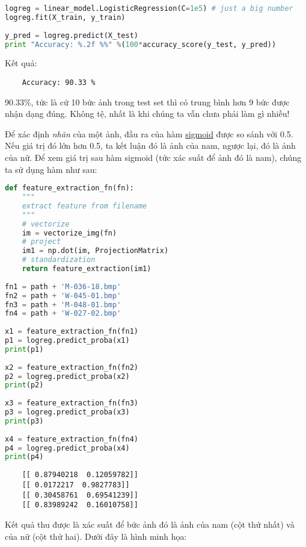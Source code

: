  
\begin{lstlisting}[language=Python]
logreg = linear_model.LogisticRegression(C=1e5) # just a big number  
logreg.fit(X_train, y_train) 
 
y_pred = logreg.predict(X_test) 
print "Accuracy: %.2f %%" %(100*accuracy_score(y_test, y_pred)) 
\end{lstlisting}
Kết quả:
\begin{lstlisting}
    Accuracy: 90.33 % 
\end{lstlisting}
 
90.33\%, tức là cứ 10 bức ảnh trong test set thì có trung bình hơn 9 bức được nhận dạng đúng. Không tệ, nhất là khi chúng ta vẫn chưa phải làm gì nhiều! 
 
Để xác định \textit{nhãn} của một ảnh, đầu ra của hàm \href{http://machinelearningcoban.com/2017/01/27/logisticregression/#sigmoid-function}{sigmoid} được so sánh với 0.5. Nếu giá trị đó lớn hơn 0.5, ta kết luận đó là ảnh của nam, ngược lại, đó là ảnh của nữ. Để xem giá trị sau hàm sigmoid (tức xác suất để ảnh đó là nam), chúng ta sử dụng hàm  như sau: 
 
\begin{lstlisting}[language=Python]
def feature_extraction_fn(fn): 
    """ 
    extract feature from filename 
    """ 
    # vectorize 
    im = vectorize_img(fn) 
    # project 
    im1 = np.dot(im, ProjectionMatrix) 
    # standardization  
    return feature_extraction(im1) 
 
fn1 = path + 'M-036-18.bmp' 
fn2 = path + 'W-045-01.bmp' 
fn3 = path + 'M-048-01.bmp' 
fn4 = path + 'W-027-02.bmp' 
 
x1 = feature_extraction_fn(fn1) 
p1 = logreg.predict_proba(x1) 
print(p1) 
 
x2 = feature_extraction_fn(fn2) 
p2 = logreg.predict_proba(x2) 
print(p2) 
 
x3 = feature_extraction_fn(fn3) 
p3 = logreg.predict_proba(x3) 
print(p3) 
 
x4 = feature_extraction_fn(fn4) 
p4 = logreg.predict_proba(x4) 
print(p4) 
\end{lstlisting}
\begin{lstlisting}
    [[ 0.87940218  0.12059782]] 
    [[ 0.0172217  0.9827783]] 
    [[ 0.30458761  0.69541239]] 
    [[ 0.83989242  0.16010758]] 
\end{lstlisting}
 
Kết quả thu được là xác suất để bức ảnh đó là ảnh của nam (cột thứ nhất) và của nữ (cột thứ hai). Dưới đây là hình minh họa: 
 
